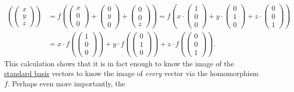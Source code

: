 \begin{align*}
 \left( 
 \begin{pmatrix}
  x\\
  y\\
  z
 \end{pmatrix}
\right) &= f \left( 
 \begin{pmatrix}
  x\\
  0\\
  0
 \end{pmatrix} + 
 \begin{pmatrix}
  0\\
  y\\
  0
 \end{pmatrix}
 +
 \begin{pmatrix}
  0\\
  0\\
  z
 \end{pmatrix}
 \right) = f \left( x \cdot 
 \begin{pmatrix}
  1\\
  0\\
  0
 \end{pmatrix} + y \cdot
 \begin{pmatrix}
  0\\
  1\\
  0
 \end{pmatrix} + z \cdot 
 \begin{pmatrix}
  0\\
  0\\
  1
 \end{pmatrix}
 \right)\\
 &= x \cdot f \left( 
 \begin{pmatrix}
  1\\
  0\\
  0
 \end{pmatrix}
 \right) + y \cdot f \left( 
 \begin{pmatrix}
  0\\
  1\\
  0
 \end{pmatrix}
 \right) + z \cdot f \left( 
 \begin{pmatrix}
  0\\
  0\\
  1
 \end{pmatrix}
 \right).
\end{align*}
This calculation shows that it is in fact enough to know the image of the
\hyperref[def:standard-basis]{standard basis} vectors to know the image of
\emph{every} vector via the homomorphism $f$. Perhaps even more importantly, the
